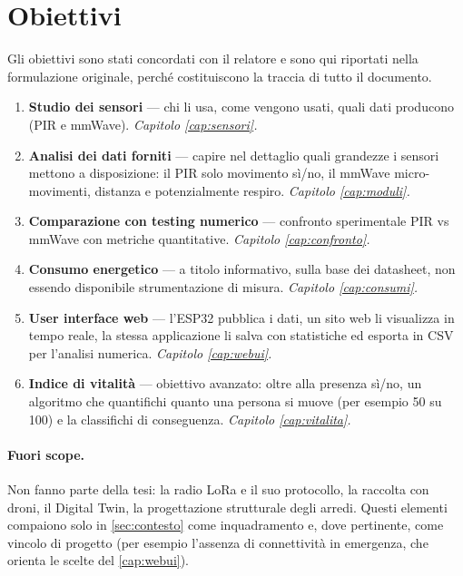 \section{Obiettivi}
\label{sec:obiettivi}

Gli obiettivi sono stati concordati con il relatore e sono qui riportati nella
formulazione originale, perché costituiscono la traccia di tutto il documento.

\begin{enumerate}[label=\textbf{O\arabic*.},leftmargin=2.6em,itemsep=4pt]
  \item \textbf{Studio dei sensori} --- chi li usa, come vengono usati, quali dati
        producono (PIR e mmWave). \emph{Capitolo \ref{cap:sensori}.}
  \item \textbf{Analisi dei dati forniti} --- capire nel dettaglio quali grandezze
        i sensori mettono a disposizione: il PIR solo movimento sì/no, il mmWave
        micro-movimenti, distanza e potenzialmente respiro.
        \emph{Capitolo \ref{cap:moduli}.}
  \item \textbf{Comparazione con testing numerico} --- confronto sperimentale
        PIR vs mmWave con metriche quantitative. \emph{Capitolo \ref{cap:confronto}.}
  \item \textbf{Consumo energetico} --- a titolo informativo, sulla base dei
        datasheet, non essendo disponibile strumentazione di misura.
        \emph{Capitolo \ref{cap:consumi}.}
  \item \textbf{User interface web} --- l'ESP32 pubblica i dati, un sito web li
        visualizza in tempo reale, la stessa applicazione li salva con statistiche
        ed esporta in CSV per l'analisi numerica. \emph{Capitolo \ref{cap:webui}.}
  \item \textbf{Indice di vitalità} --- obiettivo avanzato: oltre alla presenza
        sì/no, un algoritmo che quantifichi quanto una persona si muove
        (per esempio 50 su 100) e la classifichi di conseguenza.
        \emph{Capitolo \ref{cap:vitalita}.}
\end{enumerate}

\paragraph{Fuori scope.} Non fanno parte della tesi: la radio LoRa e il suo
protocollo, la raccolta con droni, il Digital Twin, la progettazione strutturale
degli arredi. Questi elementi compaiono solo in \cref{sec:contesto} come
inquadramento e, dove pertinente, come vincolo di progetto (per esempio l'assenza
di connettività in emergenza, che orienta le scelte del \cref{cap:webui}).

